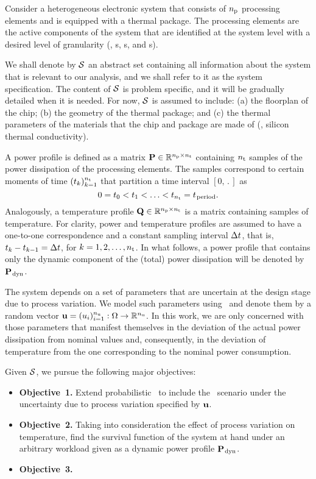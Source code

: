 Consider a heterogeneous electronic system that consists of ${n_\text{p}}$ processing elements and is equipped with a thermal package.
The processing elements are the active components of the system that are identified at the system level with a desired level of granularity (\eg, s, s, and s).

We shall denote by $\mathcal{S}$ an abstract set containing all information about the system that is relevant to our analysis, and we shall refer to it as the system specification.
The content of $\mathcal{S}$ is problem specific, and it will be gradually detailed when it is needed.
For now, $\mathcal{S}$ is assumed to include: (a) the floorplan of the chip; (b) the geometry of the thermal package; and (c) the thermal parameters of the materials that the chip and package are made of (\eg, silicon thermal conductivity).

A power profile is defined as a matrix $\mathbf{P} \in \mathbb{R}^{{n_\text{p}} \times {n_\text{t}}}$ containing ${n_\text{t}}$ samples of the power dissipation of the processing elements.
The samples correspond to certain moments of time $(t_k)_{k = 1}^{n_\text{t}}$ that partition a time interval $[0, \period]$ as
\[
  0 = t_0 < t_1 < \dotsc < t_{n_\text{t}} = t_{\text{\kern0.1emperiod}}.
\]
Analogously, a temperature profile $\mathbf{Q} \in \mathbb{R}^{{n_\text{p}} \times {n_\text{t}}}$ is a matrix containing samples of temperature.
For clarity, power and temperature profiles are assumed to have a one-to-one correspondence and a constant sampling interval $\Delta t$, that is, $t_k - t_{k - 1} = \Delta t$, for $k = 1, 2, \dots, {n_\text{t}}$.
In what follows, a power profile that contains only the dynamic component of the (total) power dissipation will be denoted by $\mathbf{P}_{\text{\kern0.1emdyn}}$.

The system depends on a set of parameters that are uncertain at the design stage due to process variation.
We model such parameters using \rvs\ and denote them by a random vector $\mathbf{u} = (u_i)_{i = 1}^{n_\text{u}}: \Omega \to \mathbb{R}^{n_\text{u}}$.
In this work, we are only concerned with those parameters that manifest themselves in the deviation of the actual power dissipation from nominal values and, consequently, in the deviation of temperature from the one corresponding to the nominal power consumption.

Given $\mathcal{S}$, we pursue the following major objectives:
\begin{itemize}
  \item {\bfseries Objective~1.} Extend probabilistic \ta\ to include the \DSS\ scenario under the uncertainty due to process variation specified by $\mathbf{u}$.
  \item {\bfseries Objective~2.} Taking into consideration the effect of process variation on temperature, find the survival function of the system at hand under an arbitrary workload given as a dynamic power profile $\mathbf{P}_{\text{\kern0.1emdyn}}$.
  \item {\bfseries Objective~3.} 
\end{itemize}

